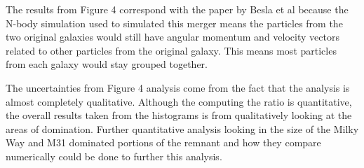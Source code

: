 \documentclass[linenumbers,trackchanges]{aastex7}
\begin{document}
The results from Figure 4 correspond with the paper by Besla et al because the N-body simulation used to simulated this merger means the particles from the two original galaxies would still have angular momentum and velocity vectors related to other particles from the original galaxy. This means most particles from each galaxy would stay grouped together. 

The uncertainties from Figure 4 analysis come from the fact that the analysis is almost completely qualitative. Although the computing the ratio is quantitative, the overall results taken from the histograms is from qualitatively looking at the areas of domination. Further quantitative analysis looking in the size of the Milky Way and M31 dominated portions of the remnant and how they compare numerically could be done to further this analysis. 

{}



\end{document}
